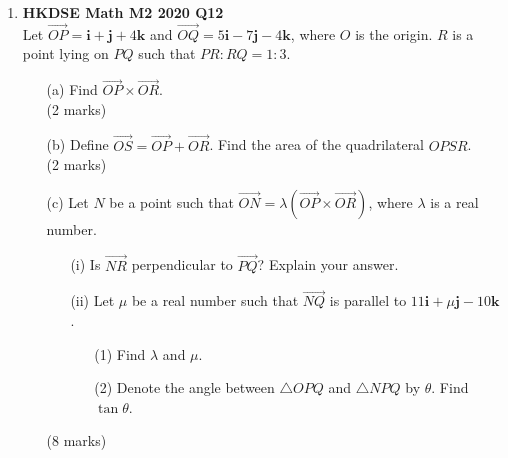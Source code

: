 \documentclass[12pt]{article}
\begin{document}
\begin{enumerate}
	\item \textbf{HKDSE Math M2 2020 Q12}\\
	Let $\overrightarrow{OP} = \textbf{i} + \textbf{j}+ 4\textbf {k}$ and $\overrightarrow{OQ} = 5\textbf{i} -7 \textbf{j}- 4\textbf {k}$, where $O$ is the origin. $R$ is a point lying on $PQ$ such that $PR:RQ = 1:3$. 
	\begin{enumerate}
		\item [(a)]Find $\overrightarrow{OP} \times \overrightarrow{OR}$. \\(2 marks)
		\item [(b)]Define $\overrightarrow{OS} = \overrightarrow{OP} + \overrightarrow{OR}$. Find the area of the quadrilateral $OPSR$. \\(2 marks)
		\item [(c)]Let $N$ be a point such that $\overrightarrow{ON} = \lambda(\overrightarrow{OP}\times \overrightarrow{OR})$, where $\lambda$ is a real number.
		\begin{enumerate}
			\item [(i)]Is $\overrightarrow{NR}$ perpendicular to $\overrightarrow{PQ}$? Explain your answer.
			\item [(ii)]Let $\mu$ be a real number such that $\overrightarrow{NQ}$ is parallel to $11\textbf{i} + \mu\textbf{j}-10\textbf {k}$. 
			\begin{enumerate}
				\item [(1)]Find $\lambda$ and $\mu$. 
				\item [(2)]Denote the angle between $\triangle OPQ$ and $\triangle NPQ$ by $\theta$. Find $\tan{\theta}$.
			\end{enumerate}
		\end{enumerate}
		(8 marks)
	\end{enumerate}
\end{enumerate}
\end{document}
